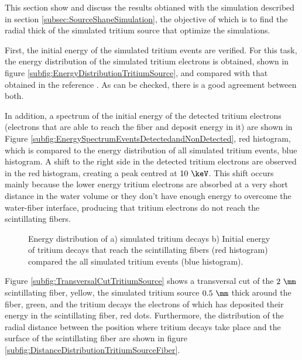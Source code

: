 This section show and discuss the results obtianed with the simulation described in section \ref{subsec:SourceShapeSimulation}, the objective of which is to find the radial thick of the simulated tritium source that optimize the simulations. 

First, the initial energy of the simulated tritium events are verified. For this task, the energy distribution of the simulated tritium electrons is obtained, shown in figure \ref{subfig:EnergyDistributionTritiumSource}, and compared with that obtained in the reference \cite{TritiumEmissionSpectrum}. As can be checked, there is a good agreement between both.

In addition, a spectrum of the initial energy of the detected tritium electrons (electrons that are able to reach the fiber and deposit energy in it) are shown in Figure \ref{subfig:EnergySpectrumEventsDetectedandNonDetected}, red histogram, which is compared to the energy distribution of all simulated tritium events, blue histogram. A shift to the right side in the detected tritium electrons are observed in the red histogram, creating a peak centred at $10~\keV$. This shift occurs mainly because the lower energy tritium electrons are absorbed at a very short distance in the water volume or they don't have enough energy to overcome the water-fiber interface, producing that tritium electrons do not reach the scintillating fibers.

\begin{figure}[h]
 \centering
 \caption{ Energy distribution of a) simulated tritium decays b) Initial energy of tritium decays that reach the scintillating fibers (red histogram) compared the all simulated tritium events (blue histogram).}
 \label{fig:TritiumSourceOptimization}
\end{figure}

Figure \ref{subfig:TransversalCutTritiumSource} shows a transversal cut of the $2~\mm$ scintillating fiber, yellow, the simulated tritium source $0.5~\mm$ thick around the fiber, green, and the tritium decays the electrons of which has deposited their energy in the scintillating fiber, red dots. Furthermore, the distribution of the radial distance between the position where tritium decays take place and the surface of the scintillating fiber are shown in figure \ref{subfig:DistanceDistributionTritiumSourceFiber}.

